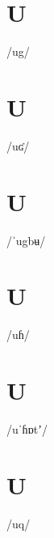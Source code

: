 \documentclass[10pt,a4paper,twoside]{book}
\begin{document}
\section*{U}

\begin{multicols}{3}
 {/ug/} {}
\end{multicols}

\section*{U}

\begin{multicols}{3}
 {/uʛ/} {}
\end{multicols}

\section*{U}

\begin{multicols}{3}
 {/ˈugbʉ/} {}
\end{multicols}

\section*{U}

\begin{multicols}{3}
 {/uɦ/} {}
\end{multicols}

\section*{U}

\begin{multicols}{3}
 {/uˈɦɒtʼ/} {}
\end{multicols}

\section*{U}

\begin{multicols}{3}
 {/uq/} {}
\end{multicols}
\end{document}
